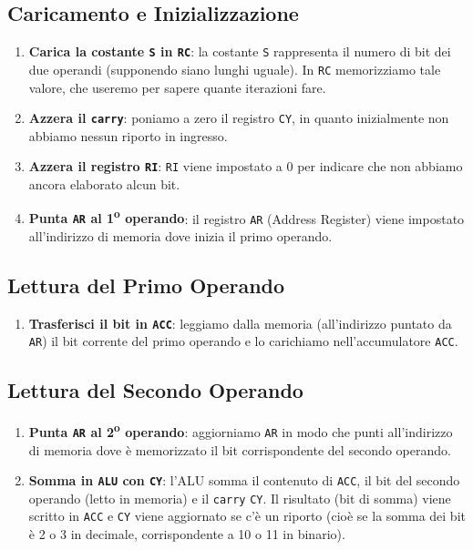 \documentclass[a4paper,12pt]{report}
\begin{document}
\subsection{Caricamento e Inizializzazione}
\begin{enumerate}
    \item \textbf{Carica la costante \texttt{S} in \texttt{RC}}: la costante \texttt{S} rappresenta il numero di bit dei due operandi (supponendo siano lunghi uguale). In \texttt{RC} memorizziamo tale valore, che useremo per sapere quante iterazioni fare.
    \item \textbf{Azzera il \texttt{carry}}: poniamo a zero il registro \texttt{CY}, in quanto inizialmente non abbiamo nessun riporto in ingresso.
    \item \textbf{Azzera il registro \texttt{RI}}: \texttt{RI} viene impostato a 0 per indicare che non abbiamo ancora elaborato alcun bit.
    \item \textbf{Punta \texttt{AR} al 1\textsuperscript{o} operando}: il registro \texttt{AR} (Address Register) viene impostato all'indirizzo di memoria dove inizia il primo operando.
\end{enumerate}

\subsection{Lettura del Primo Operando}
\begin{enumerate}
    \item \textbf{Trasferisci il bit in \texttt{ACC}}: leggiamo dalla memoria (all'indirizzo puntato da \texttt{AR}) il bit corrente del primo operando e lo carichiamo nell'accumulatore \texttt{ACC}.
\end{enumerate}

\subsection{Lettura del Secondo Operando}
\begin{enumerate}
    \item \textbf{Punta \texttt{AR} al 2\textsuperscript{o} operando}: aggiorniamo \texttt{AR} in modo che punti all'indirizzo di memoria dove è memorizzato il bit corrispondente del secondo operando.
    \item \textbf{Somma in \texttt{ALU} con \texttt{CY}}: l'ALU somma il contenuto di \texttt{ACC}, il bit del secondo operando (letto in memoria) e il \texttt{carry} \texttt{CY}. Il risultato (bit di somma) viene scritto in \texttt{ACC} e \texttt{CY} viene aggiornato se c'è un riporto (cioè se la somma dei bit è 2 o 3 in decimale, corrispondente a 10 o 11 in binario).
\end{enumerate}
\end{document}
